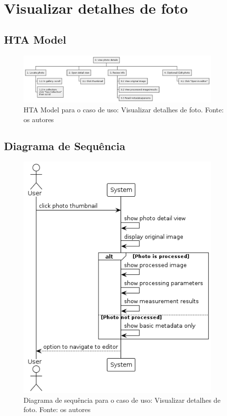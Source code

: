\section{Visualizar detalhes de foto}


\subsection{HTA Model}

\begin{figure}[H]
    \centering
    \includegraphics[width=0.9\textwidth]{../figures/hta/UC006.png}
    \caption{HTA Model para o caso de uso: Visualizar detalhes de foto. Fonte: os autores}
    \label{fig:hta-uc006}
\end{figure}

\subsection{Diagrama de Sequência}

\begin{figure}[H]
    \centering
    \includegraphics[width=0.9\textwidth]{../figures/dss/UC006.png}
    \caption{Diagrama de sequência para o caso de uso: Visualizar detalhes de foto. Fonte: os autores}
    \label{fig:dss-uc006}
\end{figure}

